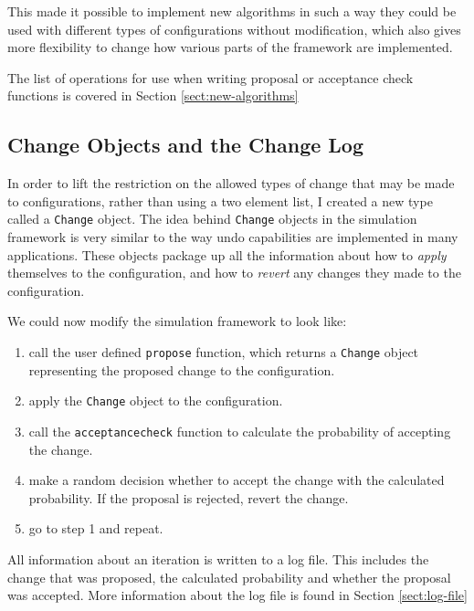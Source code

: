This made it possible to implement new algorithms in such
a way they could be used with different types of configurations
without modification, which also gives more flexibility to change how
various parts of the framework are implemented.

The list of operations for use when writing proposal or acceptance
check functions is covered in Section \ref{sect:new-algorithms}


\subsection{Change Objects and the Change Log}

In order to lift the restriction on the allowed types of change that
may be made to configurations, rather than using a two element list, I
created a new type called a \texttt{Change} object.  The idea behind
\texttt{Change} objects in the simulation framework is very similar to
the way undo capabilities are implemented in many applications.  These
objects package up all the information about how to \emph{apply}
themselves to the configuration, and how to \emph{revert} any changes
they made to the configuration.

We could now modify the simulation framework to look like:

\begin{enumerate}
\item call the user defined \texttt{propose} function, which returns a
\texttt{Change} object representing the proposed change to the
configuration.
\item apply the \texttt{Change} object to the configuration.
\item call the \texttt{acceptancecheck} function to calculate the
probability of accepting the change.
\item make a random decision whether to accept the change with the
calculated probability.  If the proposal is rejected, revert the
change.
\item go to step 1 and repeat.
\end{enumerate}

All information about an iteration is written to a log file.  This
includes the change that was proposed, the calculated probability and
whether the proposal was accepted.  More information about the log
file is found in Section \ref{sect:log-file}


%


